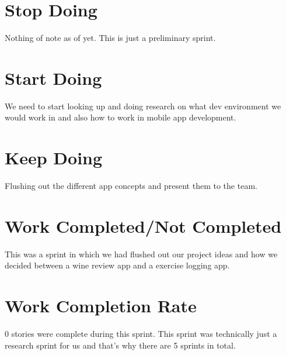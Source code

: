\documentclass[12pt,letterpaper]{article}
\begin{document}
	\section*{Stop Doing}
	Nothing of note as of yet. This is just a preliminary sprint.
	\section*{Start Doing}
	We need to start looking up and doing research on what dev environment we would work in and also how to work in mobile app development.
	\section*{Keep Doing}
	Flushing out the different app concepts and present them to the team.
	\section*{Work Completed/Not Completed}
	This was a sprint in which we had flushed out our project ideas and how we decided between a wine review app and a exercise logging app.
	\section*{Work Completion Rate}
	0 stories were complete during this sprint. This sprint was technically just a research sprint for us and that's why there are 5 sprints in total.
\end{document}
